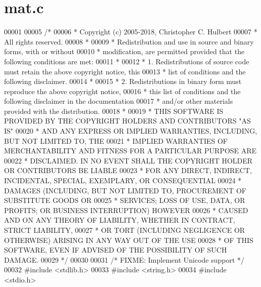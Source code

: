 \hypertarget{mat_8c_source}{}\section{mat.\+c}
\label{mat_8c_source}

\begin{DoxyCode}
00001 
00005 \textcolor{comment}{/*}
00006 \textcolor{comment}{ * Copyright (c) 2005-2018, Christopher C. Hulbert}
00007 \textcolor{comment}{ * All rights reserved.}
00008 \textcolor{comment}{ *}
00009 \textcolor{comment}{ * Redistribution and use in source and binary forms, with or without}
00010 \textcolor{comment}{ * modification, are permitted provided that the following conditions are met:}
00011 \textcolor{comment}{ *}
00012 \textcolor{comment}{ * 1. Redistributions of source code must retain the above copyright notice, this}
00013 \textcolor{comment}{ *    list of conditions and the following disclaimer.}
00014 \textcolor{comment}{ *}
00015 \textcolor{comment}{ * 2. Redistributions in binary form must reproduce the above copyright notice,}
00016 \textcolor{comment}{ *    this list of conditions and the following disclaimer in the documentation}
00017 \textcolor{comment}{ *    and/or other materials provided with the distribution.}
00018 \textcolor{comment}{ *}
00019 \textcolor{comment}{ * THIS SOFTWARE IS PROVIDED BY THE COPYRIGHT HOLDERS AND CONTRIBUTORS "AS IS"}
00020 \textcolor{comment}{ * AND ANY EXPRESS OR IMPLIED WARRANTIES, INCLUDING, BUT NOT LIMITED TO, THE}
00021 \textcolor{comment}{ * IMPLIED WARRANTIES OF MERCHANTABILITY AND FITNESS FOR A PARTICULAR PURPOSE ARE}
00022 \textcolor{comment}{ * DISCLAIMED. IN NO EVENT SHALL THE COPYRIGHT HOLDER OR CONTRIBUTORS BE LIABLE}
00023 \textcolor{comment}{ * FOR ANY DIRECT, INDIRECT, INCIDENTAL, SPECIAL, EXEMPLARY, OR CONSEQUENTIAL}
00024 \textcolor{comment}{ * DAMAGES (INCLUDING, BUT NOT LIMITED TO, PROCUREMENT OF SUBSTITUTE GOODS OR}
00025 \textcolor{comment}{ * SERVICES; LOSS OF USE, DATA, OR PROFITS; OR BUSINESS INTERRUPTION) HOWEVER}
00026 \textcolor{comment}{ * CAUSED AND ON ANY THEORY OF LIABILITY, WHETHER IN CONTRACT, STRICT LIABILITY,}
00027 \textcolor{comment}{ * OR TORT (INCLUDING NEGLIGENCE OR OTHERWISE) ARISING IN ANY WAY OUT OF THE USE}
00028 \textcolor{comment}{ * OF THIS SOFTWARE, EVEN IF ADVISED OF THE POSSIBILITY OF SUCH DAMAGE.}
00029 \textcolor{comment}{ */}
00030 
00031 \textcolor{comment}{/* FIXME: Implement Unicode support */}
00032 \textcolor{preprocessor}{#include <stdlib.h>}
00033 \textcolor{preprocessor}{#include <string.h>}
00034 \textcolor{preprocessor}{#include <stdio.h>}

\end{DoxyCode}
